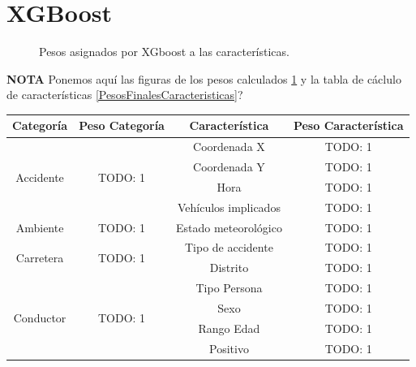 \section{XGBoost}

  \begin{figure}[H]
      \centering
      
      \caption{Pesos asignados por XGboost a las características.}
      \label{FeatureWeightsImage}
   \end{figure}

  \textbf{NOTA} Ponemos aquí las figuras de los pesos calculados \ref{FeatureWeightsImage} y la tabla de cáclulo de características \ref{PesosFinalesCaracteristicas}?

        \begin{table}[H]
          \centering
          \begin{tabular}{ |c|c|c|c| }
               \hline
               \textbf{Categoría} & \textbf{Peso Categoría} & \textbf{Característica} & \textbf{Peso Característica}\\

               \hline
               \multirow{4}{*}{Accidente}   & \multirow{4}{*}{TODO: 1}      & Coordenada X          & TODO: 1\\
                                            &                               & Coordenada Y          & TODO: 1\\
                                            &                               & Hora                  & TODO: 1\\
                                            &                               & Vehículos implicados  & TODO: 1\\

               \hline
               \multirow{1}{*}{Ambiente}    & \multirow{1}{*}{TODO: 1}      & Estado meteorológico  & TODO: 1\\

               \hline
               \multirow{2}{*}{Carretera}   & \multirow{2}{*}{TODO: 1}      & Tipo de accidente     & TODO: 1\\
                                            &                               & Distrito              & TODO: 1\\

               \hline
               \multirow{4}{*}{Conductor}   & \multirow{4}{*}{TODO: 1}      & Tipo Persona          & TODO: 1\\
                                            &                               & Sexo                  & TODO: 1\\
                                            &                               & Rango Edad            & TODO: 1\\
                                            &                               & Positivo              & TODO: 1\\
               \hline
          \end{tabular}


\end{table}
